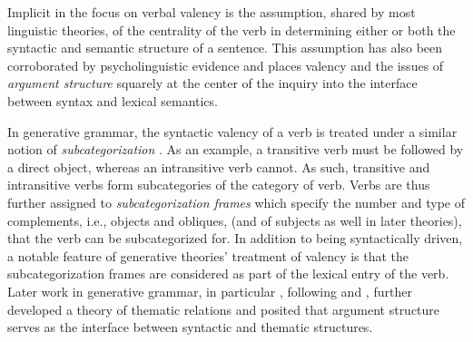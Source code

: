 Implicit in the focus on verbal valency is the assumption, shared by most linguistic theories, of the centrality of the verb in determining either or both the syntactic and semantic structure of a sentence. This assumption has also been corroborated by psycholinguistic evidence \citep{healy1970} and places valency and the issues of \textit{argument structure} squarely at the center of the inquiry into the interface between syntax and lexical semantics.

In generative grammar, the syntactic valency of a verb is treated under a similar notion of \textit{subcategorization} \citep{chomsky1965a}. As an example, a transitive verb must be followed by a direct object, whereas an intransitive verb cannot. As such, transitive and intransitive verbs form subcategories of the category of verb. Verbs are thus further assigned to \textit{subcategorization frames} which specify the number and type of complements, i.e., objects and obliques, (and of subjects as well in later theories), that the verb can be subcategorized for. In addition to being syntactically driven, a notable feature of generative theories' treatment of valency is that the subcategorization frames are considered as part of the lexical entry of the verb. Later work in generative grammar, in particular \citet{jackendoff1972,jackendoff1987,jackendoff1992}, following \citet{katz1963} and \citet{gruber1962}, further developed a theory of thematic relations and posited that argument structure serves as the interface between syntactic and thematic structures.

